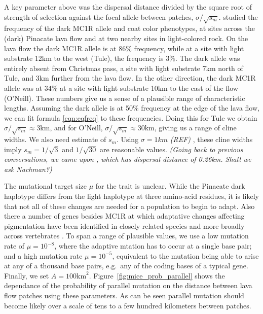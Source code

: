 \documentclass{article}
\newcommand{\gc}[1]{{\it\color{green}(#1)} }
\newcommand{\plr}[1]{{\it\color{blue}(#1)}}
\begin{document}
A key parameter above was the dispersal distance divided by the square root of strength of selection against the focal allele between patches, $\sigma/\sqrt{s_m}$. 
\citep{hoekstra2004ecological} studied the frequency of the dark MC1R allele and coat color phenotypes, 
at sites across the (dark) Pinacate lava flow and at two nearby sites in light-colored rock.
On the lava flow the dark MC1R allele is at 86\% frequency,
while at a site with light substrate 12km to the west (Tule), the frequency is 3\%.
The dark allele was entirely absent from Christmas pass, a site with light substrate 7km north of Tule, and 3km further from the lava flow.
In the other direction, the dark MC1R allele was at 34\% at a site with light substrate 10km to the east of the flow (O'Neill).
These numbers give us a sense of a plausible range of characteristic lengths.
Assuming the dark allele is at 50\% frequency at the edge of the lava flow, 
we can fit formula \eqref{eqn:eqfreq} to these frequencies.
Doing this for Tule we obtain $\sigma/\sqrt{s_m} \approx 3$km, 
and for O'Neill, $\sigma/\sqrt{s_m} \approx 30$km, giving us a range of cline widths. 
We also need estimate of $s_m$. 
Using $\sigma=1km$ \gc{REF}, these cline widths imply $s_m=1/\sqrt{3}$ and
$1/\sqrt{30}$ are reasonable values.
\plr{Going back to previous conversations, we came upon \citet{mullen2008natural}, 
which has dispersal distance of 0.26km.  Shall we ask Nachman?}

The mutational target size $\mu$ for the trait is unclear. 
While the Pinacate dark haplotype differs from the light haplotype at three amino-acid residues,
it is likely that not all of these changes are needed for a population to begin to  adapt. 
Also there a number of genes besides MC1R at which adaptative changes affecting pigmentation 
have been identified in closely related species and more broadly across vertebrates \citep{REF}.
To span a range of plausible values, we use a low mutation rate of $\mu= 10^{-8}$, 
where the adaptive mtation has to occur at a single base pair; 
and a high mutation rate $\mu= 10^{-5}$, equivalent to the mutation being able to arise at any of a thousand base pairs,
e.g.\ any of the coding bases of a typical gene.  
Finally, we set $A=100\text{km}^2$.
Figure~\ref{fig:mice_prob_parallel} shows the dependance of the probability
of parallel mutation on the distance between lava flow patches using these parameters. 
As can be seen parallel mutation should become
likely over a scale of tens to a few hundred kilometers between patches. 
\end{document}
